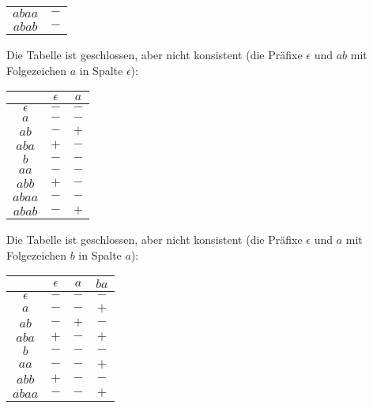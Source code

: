 \documentclass[11pt,a4paper]{article}
\begin{document}
\begin{loesung}
\begin{enumerate}
\begin{table}[h!]
\begin{tabular}{c|c}
                $abaa$ & $-$ \\
                $abab$ & $-$ \\
            \end{tabular}
        \end{table}
        \FloatBarrier
        Die Tabelle ist geschlossen, aber nicht konsistent (die Präfixe $\epsilon$ und $ab$ mit Folgezeichen $a$ in Spalte $\epsilon$):
        \begin{table}[h!]
            \centering
            \begin{tabular}{c|cc}
                & $\epsilon$ & $a$ \\
                \hline
                $\epsilon$ & $-$ & $-$ \\
                $a$ & $-$ & $-$ \\
                $ab$ & $-$ & $+$ \\
                $aba$ & $+$ & $-$ \\
                \hline
                $b$ & $-$ & $-$ \\
                $aa$ & $-$ & $-$ \\
                $abb$ & $+$ & $-$ \\
                $abaa$ & $-$ & $-$ \\
                $abab$ & $-$ & $+$ \\
            \end{tabular}
        \end{table}
        \FloatBarrier
        Die Tabelle ist geschlossen, aber nicht konsistent (die Präfixe $\epsilon$ und $a$ mit Folgezeichen $b$ in Spalte $a$):
        \begin{table}[h!]
            \centering
            \begin{tabular}{c|ccc}
                & $\epsilon$ & $a$ & $ba$ \\
                \hline
                $\epsilon$ & $-$ & $-$ & $-$ \\
                $a$ & $-$ & $-$ & $+$ \\
                $ab$ & $-$ & $+$ & $-$ \\
                $aba$ & $+$ & $-$ & $+$ \\
                \hline
                $b$ & $-$ & $-$ & $-$ \\
                $aa$ & $-$ & $-$ & $+$ \\
                $abb$ & $+$ & $-$ & $-$ \\
                $abaa$ & $-$ & $-$ & $+$ \\

\end{tabular}
\end{table}
\end{enumerate}
\end{loesung}
\end{document}
